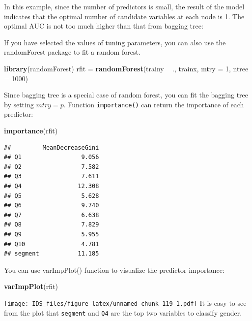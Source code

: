 \documentclass[12pt,]{krantz}
\makeatletter
\newenvironment{Shaded}{\begin{snugshade}}{\end{snugshade}}
\newcommand{\DataTypeTok}[1]{\textcolor[rgb]{0.27,0.27,0.27}{#1}}
\newcommand{\DecValTok}[1]{\textcolor[rgb]{0.06,0.06,0.06}{#1}}
\newcommand{\KeywordTok}[1]{\textcolor[rgb]{0.27,0.27,0.27}{\textbf{#1}}}
\newcommand{\NormalTok}[1]{#1}
\newcommand{\OperatorTok}[1]{\textcolor[rgb]{0.43,0.43,0.43}{\textbf{#1}}}
\newcommand{\StringTok}[1]{\textcolor[rgb]{0.5,0.5,0.5}{#1}}
\newenvironment{kframe}{%
\medskip{}
\setlength{\fboxsep}{.8em}
 \def\at@end@of@kframe{}%
 \ifinner\ifhmode%
  \def\at@end@of@kframe{\end{minipage}}%
  \begin{minipage}{\columnwidth}%
 \fi\fi%
 \def\FrameCommand##1{\hskip\@totalleftmargin \hskip-\fboxsep
 \colorbox{shadecolor}{##1}\hskip-\fboxsep
     \hskip-\linewidth \hskip-\@totalleftmargin \hskip\columnwidth}%
 \MakeFramed {\advance\hsize-\width
   \@totalleftmargin\z@ \linewidth\hsize
   \@setminipage}}%
 {\par\unskip\endMakeFramed%
 \at@end@of@kframe}
\renewenvironment{Shaded}{\begin{kframe}}{\end{kframe}}
\makeatother
\begin{document}
In this example, since the number of predictors is small, the result of the model indicates that the optimal number of candidate variables at each node is 1. The optimal AUC is not too much higher than that from bagging tree:

If you have selected the values of tuning parameters, you can also use the randomForest package to fit a random forest.

\begin{Shaded}
\begin{Highlighting}[]
\KeywordTok{library}\NormalTok{(randomForest)}
\NormalTok{rfit =}\StringTok{ }\KeywordTok{randomForest}\NormalTok{(trainy }\OperatorTok{~}\StringTok{ }\NormalTok{., trainx, }\DataTypeTok{mtry =} \DecValTok{1}\NormalTok{, }\DataTypeTok{ntree =} \DecValTok{1000}\NormalTok{)}
\end{Highlighting}
\end{Shaded}

Since bagging tree is a special case of random forest, you can fit the bagging tree by setting \(mtry=p\). Function \texttt{importance()} can return the importance of each predictor:

\begin{Shaded}
\begin{Highlighting}[]
\KeywordTok{importance}\NormalTok{(rfit)}
\end{Highlighting}
\end{Shaded}

\begin{verbatim}
##         MeanDecreaseGini
## Q1                 9.056
## Q2                 7.582
## Q3                 7.611
## Q4                12.308
## Q5                 5.628
## Q6                 9.740
## Q7                 6.638
## Q8                 7.829
## Q9                 5.955
## Q10                4.781
## segment           11.185
\end{verbatim}

You can use varImpPlot() function to visualize the predictor importance:

\begin{Shaded}
\begin{Highlighting}[]
\KeywordTok{varImpPlot}\NormalTok{(rfit)}
\end{Highlighting}
\end{Shaded}

\texttt{[image: IDS\_files/figure-latex/unnamed-chunk-119-1.pdf]}
It is easy to see from the plot that \texttt{segment} and \texttt{Q4} are the top two variables to classify gender.
\end{document}
